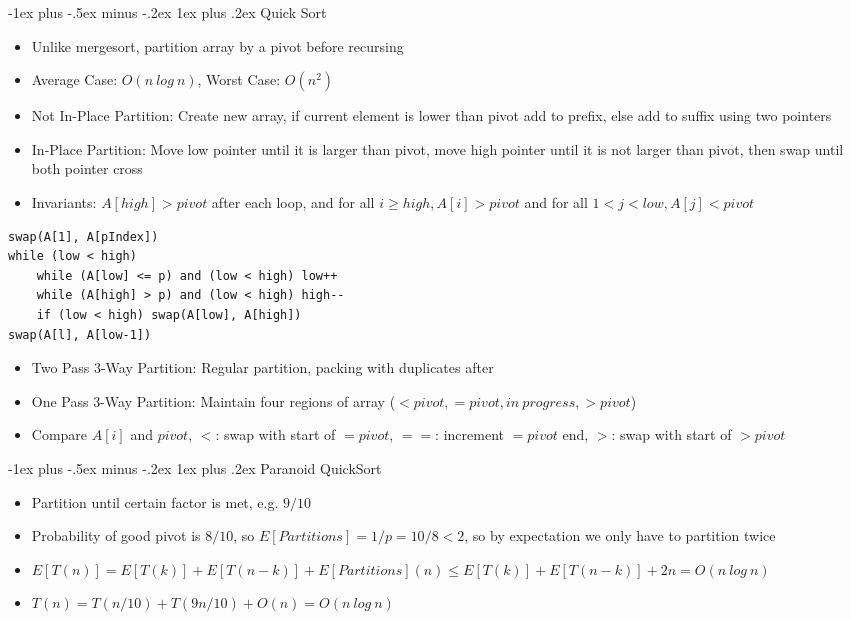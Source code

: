 \documentclass[10pt, landscape]{article}
\makeatletter
\renewcommand{\subsection}{\@startsection{subsection}{3}{0mm}%
                                {-1ex plus -.5ex minus -.2ex}%
                                {1ex plus .2ex}%
                                {\normalfont\small\bfseries}}%
\makeatother
\begin{document}
\begin{multicols*}{4}
\subsection{Quick Sort}
\begin{itemize}
    \item Unlike mergesort, partition array by a pivot before recursing
    \item Average Case: $O(n \ log \ n)$, Worst Case: $O(n^2)$
    \item Not In-Place Partition: Create new array, if current element is lower than pivot add to prefix, else add to suffix using two pointers
    \item In-Place Partition: Move low pointer until it is larger than pivot, move high pointer until it is not larger than pivot, then swap until both pointer cross
    \item Invariants: $A[high]> pivot$ after each loop, and for all $i \geq high, A[i] > pivot$ and for all $1 < j < low, A[j] < pivot$
\end{itemize}
    \begin{verbatim}
swap(A[1], A[pIndex])
while (low < high)
    while (A[low] <= p) and (low < high) low++
    while (A[high] > p) and (low < high) high--
    if (low < high) swap(A[low], A[high])
swap(A[l], A[low-1])
    \end{verbatim}
\begin{itemize}
    \item Two Pass 3-Way Partition: Regular partition, packing with duplicates after
    \item One Pass 3-Way Partition: Maintain four regions of array ($<pivot, =pivot, in \ progress, > pivot$)
    \item Compare $A[i]$ and $pivot$, $<$: swap with start of $=pivot$, $==$: increment $=pivot$ end, $>$: swap with start of $> pivot$
\end{itemize}
\subsection{Paranoid QuickSort}
\begin{itemize}
    \item Partition until certain factor is met, e.g. $9/10$
    \item Probability of good pivot is $8/10$, so $E[Partitions]=1/p=10/8<2$, so by expectation we only have to partition twice
    \item $E[T(n)]=E[T(k)]+E[T(n-k)]+E[Partitions](n) \leq E[T(k)]+E[T(n-k)]+2n=O(n \ log \ n)$
    \item $T(n)=T(n/10)+T(9n/10)+O(n)=O(n \ log \ n)$
\end{itemize}


\end{multicols*}
\end{document}
